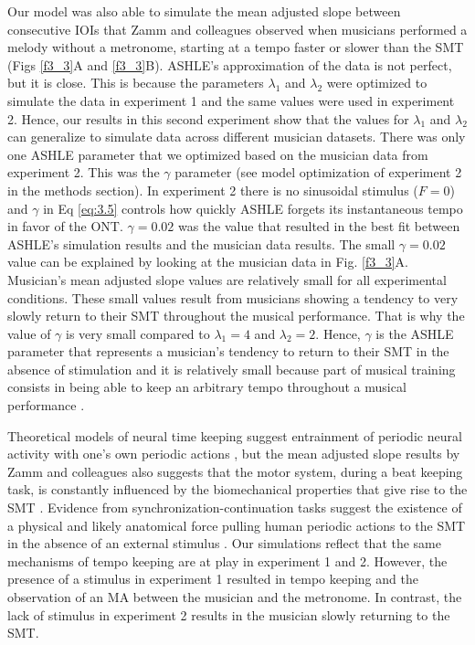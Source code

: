 \documentclass{report}
\begin{document}
Our model was also able to simulate the mean adjusted slope between consecutive IOIs that Zamm and colleagues \cite{zamm2018musicians} observed when musicians performed a melody without a metronome, starting at a tempo faster or slower than the SMT (Figs \ref{f3_3}A and \ref{f3_3}B). ASHLE's approximation of the data is not perfect, but it is close. This is because the parameters $\lambda_1$ and $\lambda_2$ were optimized to simulate the data in experiment 1 and the same values were used in experiment 2. Hence, our results in this second experiment show that the values for $\lambda_1$ and $\lambda_2$ can generalize to simulate data across different musician datasets. There was only one ASHLE parameter that we optimized based on the musician data from experiment 2. This was the $\gamma$ parameter (see model optimization of experiment 2 in the methods section). In experiment 2 there is no sinusoidal stimulus ($F=0$) and $\gamma$ in Eq \eqref{eq:3.5} controls how quickly ASHLE forgets its instantaneous tempo in favor of the ONT. $\gamma = 0.02$ was the value that resulted in the best fit between ASHLE's simulation results and the musician data results. The small $\gamma=0.02$ value can be explained by looking at the musician data in Fig.{} \ref{f3_3}A. Musician's mean adjusted slope values are relatively small for all experimental conditions. These small values result from musicians showing a tendency to very slowly return to their SMT throughout the musical performance. That is why the value of $\gamma$ is very small compared to $\lambda_1=4$ and $\lambda_2=2$. Hence, $\gamma$ is the ASHLE parameter that represents a musician's tendency to return to their SMT in the absence of stimulation and it is relatively small because part of musical training consists in being able to keep an arbitrary tempo throughout a musical performance \cite{fine2009memory, schultz2019roles}.

Theoretical models of neural time keeping suggest entrainment of periodic neural activity with one's own periodic actions \cite{large1999dynamics}, but the mean adjusted slope results by Zamm and colleagues \cite{zamm2018musicians} also suggests that the motor system, during a beat keeping task, is constantly influenced by the biomechanical properties that give rise to the SMT \cite{goodman2000advantages}. Evidence from synchronization-continuation tasks suggest the existence of a physical and likely anatomical force pulling human periodic actions to the SMT in the absence of an external stimulus \cite{yu2003task, mcauley2006time}. Our simulations reflect that the same mechanisms of tempo keeping are at play in experiment 1 and 2. However, the presence of a stimulus in experiment 1 resulted in tempo keeping and the observation of an MA between the musician and the metronome. In contrast, the lack of stimulus in experiment 2 results in the musician slowly returning to the SMT.
\end{document}
